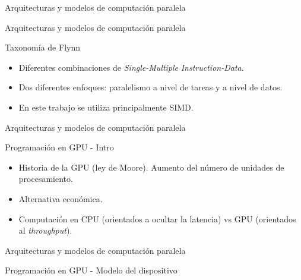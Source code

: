 \begin{frame}
\vfill
\begin{center}
\begin{block}{\begin{center}\begin{Huge}Arquitecturas y modelos de computación paralela\end{Huge}\end{center}}
\end{block}
\end{center}
\end{frame}

\begin{frame}{Arquitecturas y modelos de computación paralela}
\begin{block}{Taxonomía de Flynn}
\begin{itemize}
  \item Diferentes combinaciones de \textit{Single-Multiple} \textit{Instruction-Data}.
  \item Dos diferentes enfoques: paralelismo a nivel de tareas y a nivel de datos.
  \item En este trabajo se utiliza principalmente SIMD.
\end{itemize}
\end{block}
\end{frame}

\begin{frame}{Arquitecturas y modelos de computación paralela}
\begin{block}{Programación en GPU - Intro}
\begin{itemize}
  \item Historia de la GPU (ley de Moore). Aumento del número de unidades de procesamiento.
  \item Alternativa económica.
  \item Computación en CPU (orientados a ocultar la latencia) vs GPU (orientados al \textit{throughput}).
\end{itemize}
\centerline{}
\end{block}
\end{frame}

\begin{frame}{Arquitecturas y modelos de computación paralela}
\begin{block}{Programación en GPU - Modelo del dispositivo}
\centerline{}
\end{block}
\end{frame}

